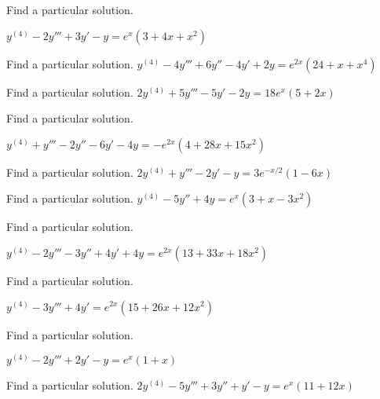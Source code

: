\documentclass{ximera}
\begin{document}
\begin{problem}\label{exer:9.3.17}   Find a particular solution.

$y^{(4)}-2y'''+3y'-y=e^x(3+4x+x^2)$
\end{problem}

\begin{problem}\label{exer:9.3.18}   Find a particular solution.   $y^{(4)}-4y'''+6y''-4y'+2y=e^{2x}(24+x+x^4)$
\end{problem}

\begin{problem}\label{exer:9.3.19}   Find a particular solution.   $2y^{(4)}+5y'''-5y'-2y=18e^x(5+2x)$
\end{problem}

\begin{problem}\label{exer:9.3.20}   Find a particular solution.

$y^{(4)}+y'''-2y''-6y'-4y=-e^{2x}(4+28x+15x^2)$
\end{problem}

\begin{problem}\label{exer:9.3.21}   Find a particular solution.   
$2y^{(4)}+y'''-2y'-y=3e^{-x/2}(1-6x)$
\end{problem}

\begin{problem}\label{exer:9.3.22}   Find a particular solution.   
$y^{(4)}-5y''+4y=e^x(3+x-3x^2)$
\end{problem}

\begin{problem}\label{exer:9.3.23}  
Find a particular solution.

$y^{(4)}-2y'''-3y''+4y'+4y=e^{2x}(13+33x+18x^2)$
\end{problem}

\begin{problem}\label{exer:9.3.24}  
Find a particular solution.

$y^{(4)}-3y'''+4y'=e^{2x}(15+26x+12x^2)$
\end{problem}

\begin{problem}\label{exer:9.3.25}   Find a particular solution. 

$y^{(4)}-2y'''+2y'-y=e^x(1+x)$
\end{problem}

\begin{problem}\label{exer:9.3.26}   Find a particular solution.   
$2y^{(4)}-5y'''+3y''+y'-y=e^x(11+12x)$
\end{problem}
\end{document}
